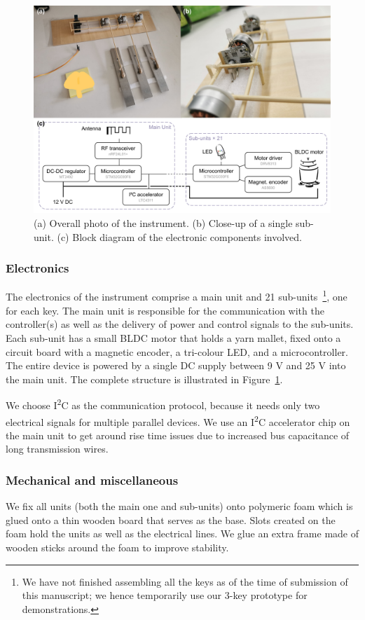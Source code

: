 \documentclass{nime-alternate} %
\begin{document}
\begin{figure}[t!]
  \centering
  \includegraphics[width=1\textwidth]{Mw_Mallet.pdf}
  \caption{(a) Overall photo of the instrument. (b) Close-up of a single sub-unit. (c) Block diagram of the electronic components involved.}
  \label{fig:MalletConstruction}
\end{figure}

\subsubsection{Electronics}
The electronics of the instrument comprise a main unit and 21 sub-units~\footnote{We have not finished assembling all the keys as of the time of submission of this manuscript; we hence temporarily use our 3-key prototype for demonstrations.}, one for each key. The main unit is responsible for the communication with the controller(s) as well as the delivery of power and control signals to the sub-units. Each sub-unit has a small BLDC motor that holds a yarn mallet, fixed onto a circuit board with a magnetic encoder, a tri-colour LED, and a microcontroller. The entire device is powered by a single DC supply between 9 V and 25 V into the main unit. The complete structure is illustrated in Figure~\ref{fig:MalletConstruction}.

We choose I\textsuperscript{2}C as the communication protocol, because it needs only two electrical signals for multiple parallel devices. We use an I\textsuperscript{2}C accelerator chip on the main unit to get around rise time issues due to increased bus capacitance of long transmission wires.

\subsubsection{Mechanical and miscellaneous}
We fix all units (both the main one and sub-units) onto polymeric foam which is glued onto a thin wooden board that serves as the base. Slots created on the foam hold the units as well as the electrical lines. We glue an extra frame made of wooden sticks around the foam to improve stability.
\end{document}

